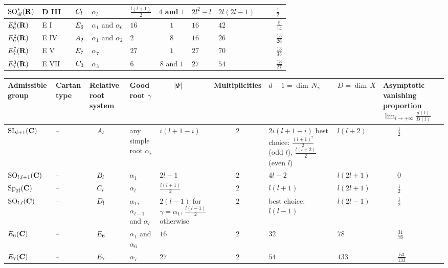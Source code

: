 \documentclass[11pt]{article}
\theoremstyle{definition}
\numberwithin{equation}{section}
\numberwithin{figure}{section}
\numberwithin{table}{section}
\DeclareMathOperator{\SL}{SL}
\DeclareMathOperator{\SO}{SO}
\DeclareMathOperator{\Sp}{Sp}
\begin{document}
\begin{landscape}
\begin{tabular}{| M{2cm} || M{1.2cm} | M{1.7cm} | M{1.3cm} | M{2cm} | c | M{2.7cm} | M{2.1cm} | M{2.8cm} |}
${\SO}^*_{4l}({\bf R})$ & D III & $\quad{\rm C}_l$ & $\alpha_l$ & $\frac{l(l+1)}{2}$ & $4$ and $1$ & $2l^2-l$ & $2l(2l-1)$ & $\qquad\frac{1}{2}$ \tabularnewline
\hline

${\rm E}_6^6({\bf R})$ & E I & $\quad{\rm E}_6$ & $\alpha_1$ and $\alpha_6$ & $16$ & $1$ & $16$ & $42$ & $\qquad\frac{5}{14}$ \tabularnewline
\hline

${\rm E}_6^2({\bf R})$ & E IV & $\quad{\rm A}_2$ & $\alpha_1$ and $\alpha_2$ & $2$ & $8$ & $16$ & $26$ & $\qquad\frac{15}{26}$ \tabularnewline
\hline

${\rm E}_7^7({\bf R})$ & E V & $\quad{\rm E}_7$ & $\alpha_7$ & $27$ & $1$ & $27$ & $70$ & $\qquad\frac{13}{35}$ \tabularnewline
\hline

${\rm E}_7^3({\bf R})$ & E VII & $\quad{\rm C}_3$ & $\alpha_3$ & $6$ & $8$ and $1$ & $27$ & $54$ & $\qquad\frac{13}{27}$ \tabularnewline
\hline
\end{tabular}



\begin{tabular}{| M{2cm} || M{1.2cm} | M{1.7cm} | M{1.3cm} | M{2cm} | c | M{2.8cm} | M{2.1cm} | M{2.8cm} |}
\hline

Admissible group & Cartan type & Relative root system & Good root $\gamma$ & $\qquad|\Psi |$ & Multiplicities & $d-1 = {\dim} \, N_\gamma$ & $D = {\dim} \, X$ & Asymptotic vanishing proportion $\displaystyle \lim_{l \to +\infty} \scriptstyle \frac{d(l)}{D(l)}$ \tabularnewline
\hline\hline

${\SL}_{l+1}({\bf C})$ & \quad-- & $\quad{\rm A}_l$ & any simple root $\alpha_i$ & $i(l+1-i)$ & $2$ & $2i(l+1-i)$ best choice: $\frac{(l+1)^2}{2}$ (odd $l$), $\frac{l(l+2)}{2}$ (even $l$) & $\displaystyle l(l+2)$ & $\qquad\frac{1}{2}$ \tabularnewline
\hline

${\SO}_{l,l+1}({\bf C})$ & \quad-- & $\quad{\rm B}_l$ & $\alpha_1$ & $2l-1$ & $2$ & $4l-2$ & $l(2l+1)$ & $\qquad0$ \tabularnewline
\hline

${\Sp}_{2l}({\bf C})$ & \quad-- & $\quad{\rm C}_l$ & $\alpha_l$ & $\frac{l(l+1)}{2}$ & $2$ & $l(l+1)$ & $l(2l+1)$ & $\qquad\frac{1}{2}$ \tabularnewline
\hline

${\SO}_{l,l}({\bf C})$ & \quad-- & $\quad{\rm D}_l$ & $\alpha_1$, $\alpha_{l-1}$ and $\alpha_l$ & $2(l-1)$ for $\gamma = \alpha_1$, $\frac{l(l-1)}{2}$ otherwise & $2$ & best choice: $l(l-1)$ & $l(2l-1)$ & $\qquad\frac{1}{2}$ \tabularnewline
\hline

${\rm E}_6({\bf C})$ & \quad-- & $\quad{\rm E}_6$ & $\alpha_1$ and $\alpha_6$ & $16$ & $2$ & $32$ & $78$ & $\qquad\frac{31}{78}$ \tabularnewline
\hline

${\rm E}_7({\bf C})$ & \quad-- & $\quad{\rm E}_7$ & $\alpha_7$ & $27$ & $2$ & $54$ & $133$ & $\qquad\frac{53}{133}$ \tabularnewline
\hline
\end{tabular}
\end{landscape}
\end{document}
